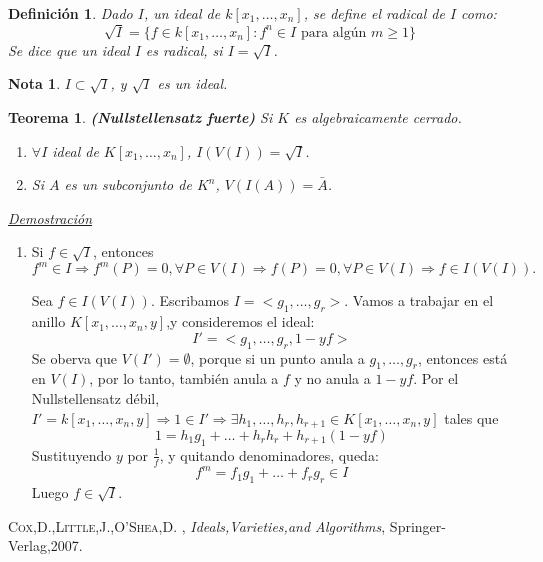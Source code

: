 \documentclass{article}
\newtheorem{teor}{Teorema}
\newtheorem{nota}{Nota}
\newtheorem{Def}{Definición}
\begin{document}
\begin{Def}
  Dado $I$, un ideal de $k[x_1,\dots, x_n]$, se define el radical de $I$ como:
  $$\sqrt{I}=\{ f \in k[x_1,\dots,x_n] : f^n \in I \text{ para algún } m\ge 1\}$$
  Se dice que un ideal $I$ es radical, si $I=\sqrt{I}$.
\end{Def}

\begin{nota}
  $I\subset \sqrt{I}$, y $\sqrt{I}$ es un ideal.
\end{nota}

\begin{teor}
  \textbf{(Nullstellensatz fuerte)} Si $K$ es algebraicamente cerrado.
  \begin{enumerate}
  \item $\forall I$ ideal de $K[x_1,\dots, x_n]$, $I(V(I))=\sqrt{I}$.
  \item Si $A$ es un subconjunto de $K^n$, $V(I(A))=\bar{A}$. 
  \end{enumerate}
\end{teor}

\textit{\underline{Demostración}}

\vspace{3mm}
\begin{enumerate}
\item \framebox{$\supseteq $} Si $f\in \sqrt{I}$, entonces $f^m\in I \Rightarrow f^m(P)=0, \forall P \in V(I) \Rightarrow f(P)=0, \forall P\in V(I) \Rightarrow f\in I(V(I)). $

\framebox{$\subseteq $} Sea $f\in I(V(I))$. Escribamos $I=<g_1,\dots,g_r>$. Vamos a trabajar en el anillo $K[x_1,\dots, x_n,y]$,y consideremos el ideal:
$$I'=<g_1,\dots,g_r,1-yf>$$
Se oberva que $V(I')=\emptyset$, porque si un punto anula a $g_1,\dots,g_r$, entonces está en $V(I)$, por lo tanto, también anula a $f$ y no anula a $1-yf$.
Por el Nullstellensatz débil, $I'=k[x_1,\dots,x_n,y] \Rightarrow 1\in I' \Rightarrow \exists h_1,\dots,h_r,h_{r+1}\in K[x_1,\dots,x_n,y]$ tales que
$$1=h_1g_1+\dots+h_rh_r+h_{r+1}(1-yf) $$
Sustituyendo $y$ por $\frac{1}{f}$, y quitando denominadores, queda:
$$f^m=f_1g_1+\dots+f_rg_r\in I$$
Luego $f\in \sqrt{I}$.
\end{enumerate}


\begin{thebibliography}{X}
 \textsc{Cox,D.,Little,J.,O'Shea,D.} ,
\textit{Ideals,Varieties,and Algorithms}, Springer-Verlag,2007.
\end{thebibliography}
\end{document}

